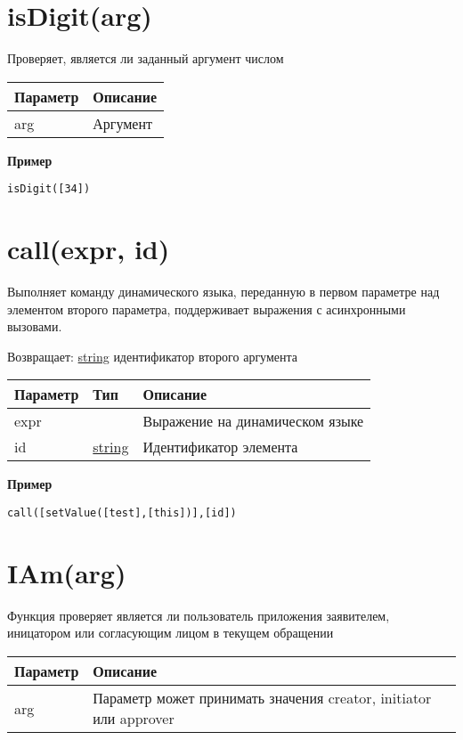 \hypertarget{isdigitarg-boolean}{%
\section{isDigit(arg)}\label{isdigitarg-boolean}}

Проверяет, является ли заданный аргумент числом

\begin{longtable}[]{@{}ll@{}}
\toprule
Параметр & Описание\tabularnewline
\midrule
\endhead
arg & Аргумент\tabularnewline
\bottomrule
\end{longtable}

\textbf{Пример}

\begin{verbatim}
isDigit([34])
\end{verbatim}

\hypertarget{callexpr-id-string}{%
\section{call(expr, id)}\label{callexpr-id-string}}

Выполняет команду динамического языка, переданную в первом параметре над
элементом второго параметра, поддерживает выражения с асинхронными
вызовами.

Возвращает: \protect\hyperlink{string}{string} идентификатор второго аргумента

\begin{longtable}[]{@{}lll@{}}
\toprule
Параметр & Тип & Описание\tabularnewline
\midrule
\endhead
expr & & Выражение на динамическом языке\tabularnewline
id & \protect\hyperlink{string}{string} & Идентификатор
элемента\tabularnewline
\bottomrule
\end{longtable}

\textbf{Пример}

\begin{verbatim}
call([setValue([test],[this])],[id])
\end{verbatim}

\hypertarget{iamarg-boolean}{%
\section{IAm(arg)}\label{iamarg-boolean}}

Функция проверяет является ли пользователь приложения заявителем,
иницатором или согласующим лицом в текущем обращении


\begin{longtable}{@{} *{1}{l} p{10cm} @{}}
\toprule
Параметр & Описание\tabularnewline
\midrule
\endhead
arg & Параметр может принимать значения creator, \newline  initiator или
 approver\tabularnewline
\bottomrule
\end{longtable}

